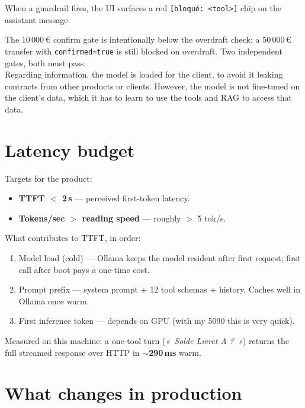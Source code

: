 \documentclass[11pt]{article}
\begin{document}
When a guardrail fires, the UI surfaces a red \texttt{[bloqué: <tool>]} chip on the assistant message.

The 10\,000\,\euro{} confirm gate is intentionally below the overdraft check: a 50\,000\,\euro{} transfer with \texttt{confirmed=true} is still blocked on overdraft. Two independent gates, both must pass.\\

Regarding information, the model is loaded for the client, to avoid it leaking contracts from other products or clients. However, the model is not fine-tuned on the client's data, which it has to learn to use the tools and RAG to access that data.

\section{Latency budget}

Targets for the product:

\begin{itemize}[leftmargin=*]
  \item \textbf{TTFT $<$ 2\,s} --- perceived first-token latency.
  \item \textbf{Tokens/sec $>$ reading speed} --- roughly $>$ 5 tok/s.
\end{itemize}

What contributes to TTFT, in order:

\begin{enumerate}[leftmargin=*]
  \item Model load (cold) --- Ollama keeps the model resident after first request; first call after boot pays a one-time cost.
  \item Prompt prefix --- system prompt + 12 tool schemas + history. Caches well in Ollama once warm.
  \item First inference token --- depends on GPU (with my 5090 this is very quick).
\end{enumerate}

Measured on this machine: a one-tool turn (\textit{«~Solde Livret A ?~»}) returns the full streamed response over HTTP in \textbf{$\sim$290\,ms} warm.

\section{What changes in production}
\end{document}

